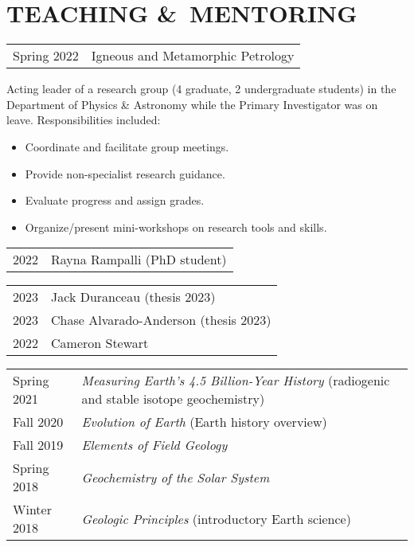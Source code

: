 \section*{TEACHING \&\ MENTORING}
\begin{tabular}{p{.15\linewidth} p{.85\linewidth}} %
Spring 2022 & Igneous and Metamorphic Petrology
\end{tabular}

Acting leader of a research group (4 graduate, 2 undergraduate students) in the Department of Physics \& Astronomy while the Primary Investigator was on leave. Responsibilities included:
\begin{itemize}
\item Coordinate and facilitate group meetings.
\item Provide non-specialist research guidance.
\item Evaluate progress and assign grades.
\item Organize/present mini-workshops on research tools and skills.
\end{itemize}

\begin{tabular}{ll}
	2022\ongoing & Rayna Rampalli (PhD student)\\
\end{tabular}
\begin{tabular}{ll}
	2023 & Jack Duranceau (thesis 2023)\\
	2023 & Chase Alvarado-Anderson (thesis 2023)\\
	2022 & Cameron Stewart \\
\end{tabular}

\begin{tabular}{p{.15\linewidth} p{.85\linewidth}} %
	Spring 2021 & \textit{Measuring Earth’s 4.5 Billion-Year History} (radiogenic and stable isotope geochemistry)\\
	Fall 2020 & \textit{Evolution of Earth} (Earth history overview) \\
	Fall 2019 & \textit{Elements of Field Geology}\\
	Spring 2018 & \textit{Geochemistry of the Solar System}\\
	Winter 2018 & \textit{Geologic Principles} (introductory Earth science)
\end{tabular}

